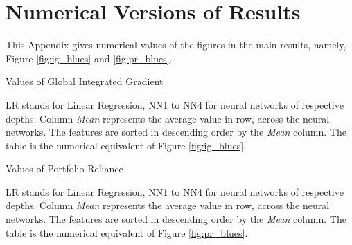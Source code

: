 \chapter{Numerical Versions of Results}
\label{chap:numerical_results} 

This Appendix gives numerical values of the figures in the main results, namely, Figure \ref{fig:ig_blues} and \ref{fig:pr_blues}. 
 

\begin{table}
	\resizebox{\textwidth}{!}{}
	\caption{Values of Global Integrated Gradient}
	\label{tab:ig_blues}
	\medskip
	\small
	LR stands for Linear Regression, NN1 to NN4 for neural networks of respective depths. Column \textit{Mean} represents the average value in row, across the neural networks. The features are sorted in descending order by the \textit{Mean} column. The table is the numerical equivalent of Figure \ref{fig:ig_blues}. 
\end{table}

 

\begin{table}
		\resizebox{\textwidth}{!}{}
		\caption{Values of Portfolio Reliance}
		\label{tab:pr_blues}
		\medskip
		\small
		LR stands for Linear Regression, NN1 to NN4 for neural networks of respective depths. Column \textit{Mean} represents the average value in row, across the neural networks. The features are sorted in descending order by the \textit{Mean} column. The table is the numerical equivalent of Figure \ref{fig:pr_blues}. 
\end{table}

 




